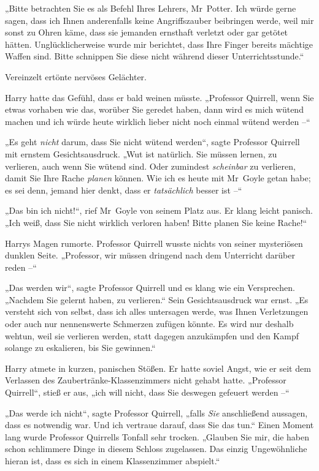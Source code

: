 {„Bitte betrachten Sie es als Befehl Ihres Lehrers, Mr~Potter. Ich würde gerne sagen, dass ich Ihnen anderenfalls keine Angriffszauber beibringen werde, weil mir sonst zu Ohren käme, dass sie jemanden ernsthaft verletzt oder gar getötet hätten. Unglücklicherweise wurde mir berichtet, dass Ihre Finger bereits mächtige Waffen sind. Bitte schnippen Sie diese nicht während dieser Unterrichtsstunde.“

Vereinzelt ertönte nervöses Gelächter.

Harry hatte das Gefühl, dass er bald weinen müsste. „Professor Quirrell, wenn Sie etwas vorhaben wie das, worüber Sie geredet haben, dann wird es mich wütend machen und ich würde heute wirklich lieber nicht noch einmal wütend werden --“

„Es geht \emph{nicht} darum, dass Sie nicht wütend werden“, sagte Professor Quirrell mit ernstem Gesichtsausdruck. „Wut ist natürlich. Sie müssen lernen, zu verlieren, auch wenn Sie wütend sind. Oder zumindest \emph{scheinbar} zu verlieren, damit Sie Ihre Rache \emph{planen} können. Wie ich es heute mit Mr~Goyle getan habe; es sei denn, jemand hier denkt, dass er \emph{tatsächlich} besser ist --“

„Das bin ich nicht!“, rief Mr~Goyle von seinem Platz aus. Er klang leicht panisch. „Ich weiß, dass Sie nicht wirklich verloren haben! Bitte planen Sie keine Rache!“

Harrys Magen rumorte. Professor Quirrell wusste nichts von seiner mysteriösen dunklen Seite. „Professor, wir müssen dringend nach dem Unterricht darüber reden --“

„Das werden wir“, sagte Professor Quirrell und es klang wie ein Versprechen. „Nachdem Sie gelernt haben, zu verlieren.“ Sein Gesichtsausdruck war ernst. „Es versteht sich von selbst, dass ich alles untersagen werde, was Ihnen Verletzungen oder auch nur nennenswerte Schmerzen zufügen könnte. Es wird nur deshalb wehtun, weil sie verlieren werden, statt dagegen anzukämpfen und den Kampf solange zu eskalieren, bis Sie gewinnen.“

Harry atmete in kurzen, panischen Stößen. Er hatte soviel Angst, wie er seit dem Verlassen des Zaubertränke-Klassenzimmers nicht gehabt hatte. „Professor Quirrell“, stieß er aus, „ich will nicht, dass Sie deswegen gefeuert werden --“

„Das werde ich nicht“, sagte Professor Quirrell, „falls \emph{Sie} anschließend aussagen, dass es notwendig war. Und ich vertraue darauf, dass Sie das tun.“ Einen Moment lang wurde Professor Quirrells Tonfall sehr trocken. „Glauben Sie mir, die haben schon schlimmere Dinge in diesem Schloss zugelassen. Das einzig Ungewöhnliche hieran ist, dass es sich in einem Klassenzimmer abspielt.“

}
